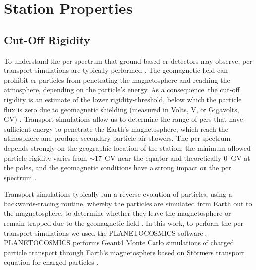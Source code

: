 \section{Station Properties}\label{sec:HS_properties}

\subsection{Cut-Off Rigidity}

To understand the \gls{pcr} spectrum that ground-based \gls{cr} detectors may observe, \gls{pcr} transport simulations are typically performed \citep{mccracken_trajectories_1962,plainaki_neutron_2009,danilova_mapping_2019}. The geomagnetic field can prohibit \gls{cr} particles from penetrating the magnetosphere and reaching the atmosphere, depending on the particle's energy. As a consequence, the cut-off rigidity is an estimate of the lower rigidity-threshold, below which the particle flux is zero due to geomagnetic shielding (measured in Volts, V, or Gigavolts, GV) \citep{shea_study_1965, danilova_mapping_2019}. Transport simulations allow us to determine the range of \glspl{pcr} that have sufficient energy to penetrate the Earth's magnetosphere, which reach the atmosphere and produce secondary particle air showers. The \gls{pcr} spectrum depends strongly on the geographic location of the station; the minimum allowed particle rigidity varies from $\sim 17$~GV near the equator and theoretically 0~GV at the poles, and the geomagnetic conditions have a strong impact on the \gls{pcr} spectrum \citep{shea_study_1965, cramp_modelling_1996, desorgher_planetocosmics_2006, danilova_mapping_2019}. 

Transport simulations typically run a reverse evolution of particles, using a backwards-tracing routine, whereby the particles are simulated from Earth out to the magnetosphere, to determine whether they leave the magnetosphere or remain trapped due to the geomagnetic field \citep{shea_study_1965}. In this work, to perform the \gls{pcr} transport simulations we used the PLANETOCOSMICS software \citep{desorgher_planetocosmics_2005}. PLANETOCOSMICS performs Geant4 Monte Carlo simulations of charged particle transport through Earth's magnetosphere based on St\"{o}rmers transport equation for charged particles \citep{desorgher_planetocosmics_2005, desorgher_planetocosmics_2006}. 

